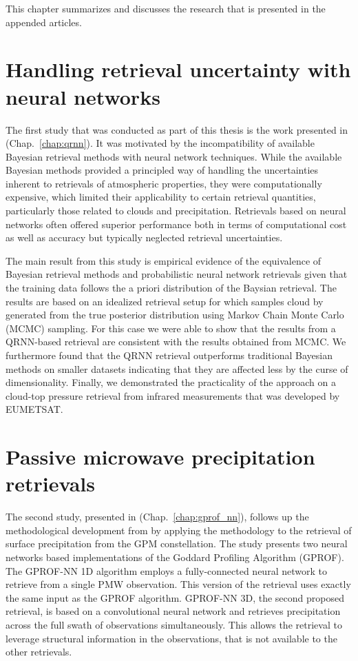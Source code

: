 
This chapter summarizes and discusses the research that is
presented in the appended articles.

\section{Handling retrieval uncertainty with neural networks}

The first study that was conducted as part of this thesis is the work presented
in \citet{pfreundschuh18} (Chap.~\ref{chap:qrnn}). It was motivated by the
incompatibility of available Bayesian retrieval methods with neural network
techniques. While the available Bayesian methods provided a principled way of
handling the uncertainties inherent to retrievals of atmospheric properties,
they were computationally expensive, which limited their applicability to
certain retrieval quantities, particularly those related to clouds and
precipitation. Retrievals based on neural networks often offered superior
performance both in terms of computational cost as well as accuracy but
typically neglected retrieval uncertainties.


The main result from this study is empirical evidence of the equivalence of
Bayesian retrieval methods and probabilistic neural network retrievals given
that the training data follows the a priori distribution of the Baysian
retrieval. The results are based on an idealized retrieval setup for which
samples cloud by generated from the true posterior distribution using Markov
Chain Monte Carlo (MCMC) sampling. For this case we were able to show that the
results from a QRNN-based retrieval are consistent with the results obtained
from MCMC. We furthermore found that the QRNN retrieval outperforms traditional
Bayesian methods on smaller datasets indicating that they are affected less by
the curse of dimensionality. Finally, we demonstrated the practicality of the
approach on a cloud-top pressure retrieval from infrared measurements that was
developed by EUMETSAT.

\section{Passive microwave precipitation retrievals}

The second study, presented in \citet{pfreundschuh22}
(Chap.~\ref{chap:gprof_nn}), follows up the methodological development from
\citet{pfreundschuh18} by applying the methodology to the retrieval of surface
precipitation from the GPM constellation. The study presents two neural networks
based implementations of the Goddard Profiling Algorithm (GPROF). The GPROF-NN
1D algorithm employs a fully-connected neural network to retrieve from a single
PMW observation. This version of the retrieval uses exactly the same input as
the GPROF algorithm. GPROF-NN 3D, the second proposed retrieval, is based on a
convolutional neural network and retrieves precipitation across the full swath
of observations simultaneously. This allows the retrieval to leverage structural
information in the observations, that is not available to the other retrievals.

